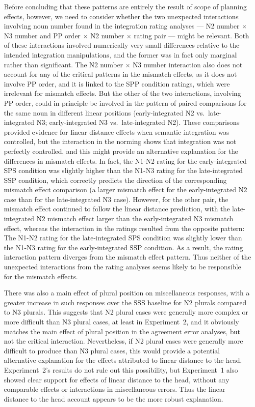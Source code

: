 \documentclass[12pt,titlepage]{article}
\begin{document}
Before concluding that these patterns are entirely the result of scope of
planning effects, however, we need to consider whether the two unexpected
interactions involving noun number found in the integration rating analyses
--- N2 number $\times$ N3 number and PP order $\times$ N2 number $\times$
rating pair --- might be relevant.  Both of these interactions involved
numerically very small differences relative to the intended integration
manipulations, and the former was in fact only marginal rather than
significant.  The N2 number $\times$ N3 number interaction also does not
account for any of the critical patterns in the mismatch effects, as it
does not involve PP order, and it is linked to the SPP condition ratings,
which were irrelevant for mismatch effects.  But the other of the two
interactions, involving PP order, could in principle be involved in the
pattern of paired comparisons for the same noun in different linear
positions (early-integrated N2 vs.\ late-integrated N3; early-integrated N3
vs.\ late-integrated N2).  These comparisons provided evidence for linear
distance effects when semantic integration was controlled, but the
interaction in the norming shows that integration was not perfectly
controlled, and this might provide an alternative explanation for the
differences in mismatch effects.  In fact, the N1-N2 rating for the
early-integrated SPS condition was slightly higher than the N1-N3 rating
for the late-integrated SSP condition, which correctly predicts the
direction of the corresponding mismatch effect comparison (a larger
mismatch effect for the early-integrated N2 case than for the
late-integrated N3 case).  However, for the other pair, the mismatch effect
continued to follow the linear distance prediction, with the
late-integrated N2 mismatch effect larger than the early-integrated N3
mismatch effect, whereas the interaction in the ratings resulted from the
opposite pattern: The N1-N2 rating for the late-integrated SPS condition
was slightly lower than the N1-N3 rating for the early-integrated SSP
condition.  As a result, the rating interaction pattern diverges from the
mismatch effect pattern.  Thus neither of the unexpected interactions from
the rating analyses seems likely to be responsible for the mismatch
effects.

There was also a main effect of plural position on miscellaneous responses,
with a greater increase in such responses over the SSS baseline for N2
plurals compared to N3 plurals.  This suggests that N2 plural cases were
generally more complex or more difficult than N3 plural cases, at least in
Experiment~2, and it obviously matches the main effect of plural position
in the agreement error analyses, but not the critical interaction.
Nevertheless, if N2 plural cases were generally more difficult to produce
than N3 plural cases, this would provide a potential alternative
explanation for the effects attributed to linear distance to the head.
Experiment~2's results do not rule out this possibility, but Experiment~1
also showed clear support for effects of linear distance to the head,
without any comparable effects or interactions in miscellaneous errors.
Thus the linear distance to the head account appears to be the more robust
explanation.
\end{document}
